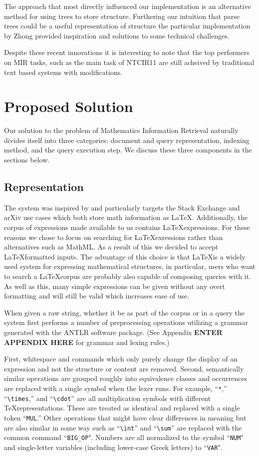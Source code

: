 \documentclass{sig-alternate}
\begin{document}
The approach that most directly influenced our implementation is an
alternative method for using trees to store structure. Furthering our
intuition that parse trees could be a useful representation of structure
the particular implementation by Zhong provided inspiration and 
solutions to some technical challenges.\cite{zhong:cowpie}

Despite these recent innovations it is interesting to note that the top performers on 
MIR tasks, such as the main task of NTCIR11 are still acheived by traditional text based
systems with modifications.

\section{Proposed Solution}
Our solution to the problem of Mathematics Information Retrieval naturally divides itself into three categories: document and query representation, indexing method, and the query execution step.  We discuss these three components in the sections below.

\subsection{Representation}
The system was inspired by and particularly targets the Stack Exchange
and arXiv use cases which both store math information as LaTeX. 
Additionally, the corpus of expressions made available to us contains
\LaTeX expressions. For these reasons we chose to focus on searching
for \LaTeX exressions rather than alternatives such as MathML. As a 
result of this we decided to accept \LaTeX formatted inputs. The advantage
of this choice is that \LaTeX is a widely used system for expressing
mathematical structures, in particular, users who want to search
a \LaTeX corpus are probably also capable of composing queries with it.
As well as this, many simple expressions can be given without any 
overt formatting and will still be valid which increases ease of use.

When given a raw string, whether it be as part of the corpus or in 
a query the system first performs a number of preprocessing operations utilizing a grammar
generated with the ANTLR software package.  (See Appendix \textbf{ENTER APPENDIX HERE} for 
grammar and lexing rules.)

First, whitespace and commands which only purely change the display of an
expression and not the structure or content are removed. Second, 
semantically similar operations are grouped roughly into equivalence 
classes and occurrences are replaced with a single symbol when the lexer runs.
For example, ``\texttt{*},'' ``\texttt{\textbackslash times},'' and ``\texttt{\textbackslash cdot}'' are all multiplication symbols with different \TeX representations.  These are treated as identical and replaced with a single token ``\texttt{MUL}.'' Other operations that might have clear differences in meaning but are also
similar in some way such as ``\texttt{\textbackslash int}'' and ``\texttt{\textbackslash sum}'' are replaced with the common command ``\texttt{BIG\_OP}". Numbers are all normalized to the symbol ``\texttt{NUM}" and single-letter variables (including lower-case Greek letters) to ``\texttt{VAR}".
\end{document}
